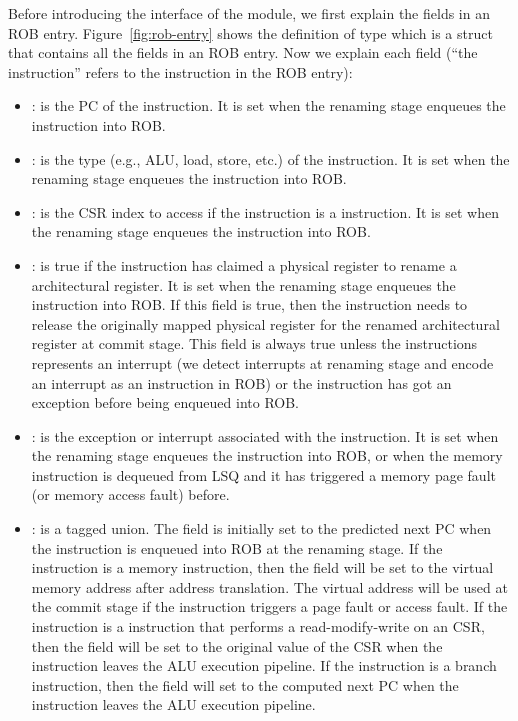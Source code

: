 Before introducing the interface of the module, we first explain the fields in an ROB entry.
Figure~\ref{fig:rob-entry} shows the definition of type  which is a struct that contains all the fields in an ROB entry.
Now we explain each field (``the instruction'' refers to the instruction in the ROB entry):
\begin{itemize}
    \item {}: is the PC of the instruction.
    It is set when the renaming stage enqueues the instruction into ROB.
    
    \item {}: is the type (e.g., ALU, load, store, etc.) of the instruction.
    It is set when the renaming stage enqueues the instruction into ROB.
    
    \item {}: is the CSR index to access if the instruction is a  instruction.
    It is set when the renaming stage enqueues the instruction into ROB.
    
    \item {}: is true if the instruction has claimed a physical register to rename a architectural register.
    It is set when the renaming stage enqueues the instruction into ROB.
    If this field is true, then the instruction needs to release the originally mapped physical register for the renamed architectural register at commit stage.
    This field is always true unless the instructions represents an interrupt (we detect interrupts at renaming stage and encode an interrupt as an instruction in ROB) or the instruction has got an exception before being enqueued into ROB.
    
    \item {}: is the exception or interrupt associated with the instruction.
    It is set when the renaming stage enqueues the instruction into ROB, or when the memory instruction is dequeued from LSQ and it has triggered a memory page fault (or memory access fault) before.
    
    \item {}: is a tagged union.
    The field is initially set to the predicted next PC when the instruction is enqueued into ROB at the renaming stage.
    If the instruction is a memory instruction, then the field will be set to the virtual memory address after address translation.
    The virtual address will be used at the commit stage if the instruction triggers a page fault or access fault.
    If the instruction is a  instruction that performs a read-modify-write on an CSR, then the field will be set to the original value of the CSR when the instruction leaves the ALU execution pipeline.
    If the instruction is a branch instruction, then the field will set to the computed next PC when the instruction leaves the ALU execution pipeline.
    

\end{itemize}
